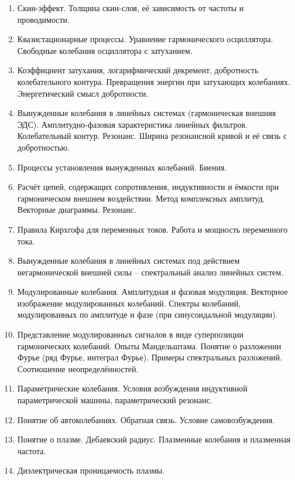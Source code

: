 \documentclass[9pt,a4paper]{article}
\begin{document}
\begin{enumerate}
\item Скин-эффект. Толщина скин-слоя, её зависимость от частоты и проводимости.
\item Квазистационарные процессы. Уравнение гармонического осциллятора. Свободные колебания осциллятора с затуханием.
\item Коэффициент затухания, логарифмический декремент, добротность колебательного контура. Превращения энергии при затухающих
колебаниях. Энергетический смысл добротности.
\item Вынужденные колебания в линейных системах (гармоническая внешняя ЭДС). Амплитудно-фазовая характеристика линейных фильтров.
Колебательный контур. Резонанс. Ширина резонансной кривой и её связь с добротностью.
\item Процессы установления вынужденных колебаний. Биения.
\item Расчёт цепей, содержащих сопротивления, индуктивности и ёмкости при гармоническом внешнем воздействии. Метод комплексных
амплитуд. Векторные диаграммы. Резонанс.
\item Правила Кирхгофа для переменных токов. Работа и мощность переменного тока.
\item Вынужденные колебания в линейных системах под действием негармонической внешней силы – спектральный анализ линейных систем.
\item Модулированные колебания. Амплитудная и фазовая модуляция. Векторное изображение модулированных колебаний. Спектры
колебаний, модулированных по амплитуде и фазе (при синусоидальной модуляции).
\item Представление модулированных сигналов в виде суперпозиции гармонических колебаний. Опыты Мандельштама. Понятие о разложении
Фурье (ряд Фурье, интеграл Фурье). Примеры спектральных разложений. Соотношение неопределённостей.
\item Параметрические колебания. Условия возбуждения индуктивной параметрической машины, параметрический резонанс.
\item Понятие об автоколебаниях. Обратная связь. Условие самовозбуждения.
\item Понятие о плазме. Дебаевский радиус. Плазменные колебания и плазменная частота.
\item Диэлектрическая проницаемость плазмы.
\end{enumerate}
\end{document}
